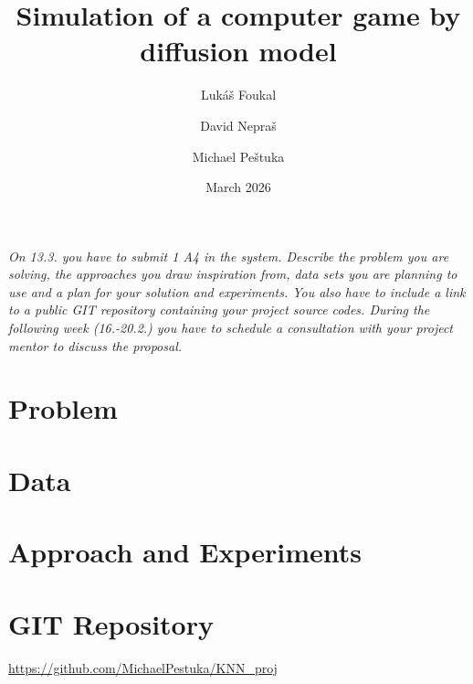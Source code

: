 \documentclass{article}
\title{Simulation of a computer game by diffusion model}
\author{
  Lukáš Foukal \and
  David Nepraš \and
  Michael Peštuka
}
\date{March 2026}
\begin{document}
\maketitle

\textit{On 13.3. you have to submit 1 A4 in the system. Describe the problem you are solving, the approaches you draw inspiration from, data sets you are planning to use and a plan for your solution and experiments. You also have to include a link to a public GIT repository containing your project source codes. During the following week (16.-20.2.) you have to schedule a consultation with your project mentor to discuss the proposal.}

\section{Problem}

\section{Data}

\section{Approach and Experiments}

\section{GIT Repository}

\url{https://github.com/MichaelPestuka/KNN_proj}
\end{document}
